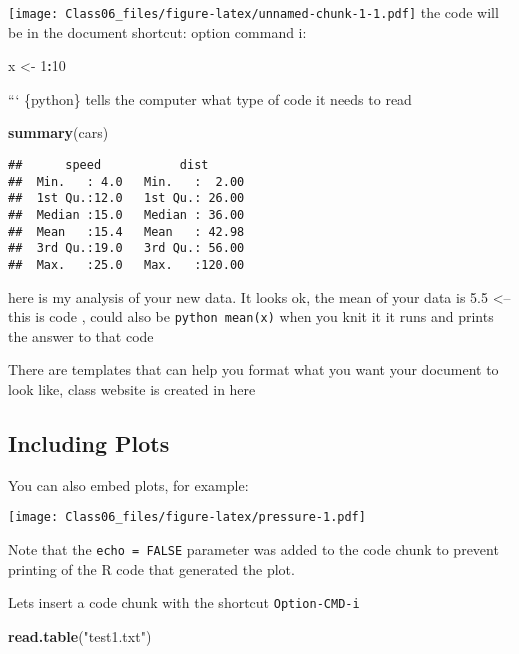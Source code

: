 \documentclass[]{article}
\newenvironment{Shaded}{\begin{snugshade}}{\end{snugshade}}
\newcommand{\DecValTok}[1]{\textcolor[rgb]{0.00,0.00,0.81}{#1}}
\newcommand{\KeywordTok}[1]{\textcolor[rgb]{0.13,0.29,0.53}{\textbf{#1}}}
\newcommand{\NormalTok}[1]{#1}
\newcommand{\OperatorTok}[1]{\textcolor[rgb]{0.81,0.36,0.00}{\textbf{#1}}}
\newcommand{\StringTok}[1]{\textcolor[rgb]{0.31,0.60,0.02}{#1}}
\begin{document}
\texttt{[image: Class06\_files/figure-latex/unnamed-chunk-1-1.pdf]} the
code will be in the document shortcut: option command i:

\begin{Shaded}
\begin{Highlighting}[]
\NormalTok{x <-}\StringTok{ }\DecValTok{1}\OperatorTok{:}\DecValTok{10}
\end{Highlighting}
\end{Shaded}

``` \{python\} tells the computer what type of code it needs to read

\begin{Shaded}
\begin{Highlighting}[]
\KeywordTok{summary}\NormalTok{(cars)}
\end{Highlighting}
\end{Shaded}

\begin{verbatim}
##      speed           dist       
##  Min.   : 4.0   Min.   :  2.00  
##  1st Qu.:12.0   1st Qu.: 26.00  
##  Median :15.0   Median : 36.00  
##  Mean   :15.4   Mean   : 42.98  
##  3rd Qu.:19.0   3rd Qu.: 56.00  
##  Max.   :25.0   Max.   :120.00
\end{verbatim}

here is my analysis of your new data. It looks ok, the mean of your data
is 5.5 \textless{}-- this is code , could also be
\texttt{python\ mean(x)} when you knit it it runs and prints the answer
to that code

There are templates that can help you format what you want your document
to look like, class website is created in here

\hypertarget{including-plots}{%
\subsection{Including Plots}\label{including-plots}}

You can also embed plots, for example:

\texttt{[image: Class06\_files/figure-latex/pressure-1.pdf]}

Note that the \texttt{echo\ =\ FALSE} parameter was added to the code
chunk to prevent printing of the R code that generated the plot.

Lets insert a code chunk with the shortcut \texttt{Option-CMD-i}

\begin{Shaded}
\begin{Highlighting}[]
\KeywordTok{read.table}\NormalTok{(}\StringTok{"test1.txt"}\NormalTok{)}
\end{Highlighting}
\end{Shaded}
\end{document}
